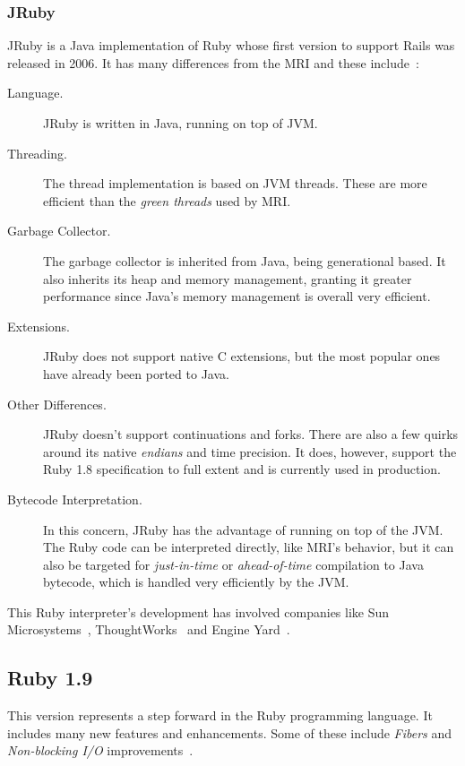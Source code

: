 \subsubsection{JRuby}
JRuby is a Java implementation of Ruby whose first version to support Rails was released in 2006. It has many differences from the MRI and these include~\cite{mri_jruby_comparison, jruby_performance_glassfish}:
\begin{description}
\item[Language.] JRuby is written in Java, running on top of JVM.
\item[Threading.] The thread implementation is based on JVM threads. These are more efficient than the \textit{green threads} used by MRI.
\item[Garbage Collector.]  The garbage collector is inherited from Java, being generational based. It also inherits its heap and memory management, granting it greater performance since Java's memory management is overall very efficient.
\item[Extensions.]  JRuby does not support native C extensions, but the most popular ones have already been ported to Java.
\item[Other Differences.] JRuby doesn't support continuations and forks. There are also a few quirks around its native \textit{endians} and time precision. It does, however, support the Ruby 1.8 specification to full extent and is currently used in production.
\item[Bytecode Interpretation.] In this concern, JRuby has the advantage of running on top of the JVM. The Ruby code can be interpreted directly, like MRI's behavior, but it can also be targeted for \textit{just-in-time} or \textit{ahead-of-time} compilation to Java bytecode, which is handled very efficiently by the JVM.
\end{description}
This Ruby interpreter's development has involved companies like Sun Microsystems~\cite{sun_jruby}, ThoughtWorks~\cite{thoughtworks_jruby} and Engine Yard~\cite{engineyard_jruby}.


\subsection{Ruby 1.9}
This version represents a step forward in the Ruby programming language. It includes many new features and enhancements. Some of these include \textit{Fibers} and \textit{Non-blocking I/O} improvements~\cite{changes_ruby19}.


